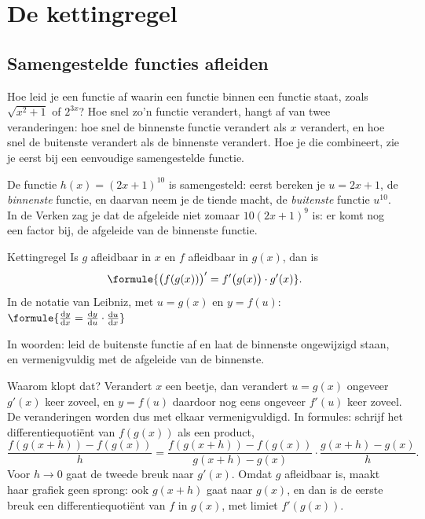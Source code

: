 \section{De kettingregel}

\subsection{Samengestelde functies afleiden}

Hoe leid je een functie af waarin een functie binnen een functie staat, zoals $\sqrt{x^2 + 1}$ of $2^{3x}$? Hoe snel zo'n functie verandert, hangt af van twee veranderingen: hoe snel de binnenste functie verandert als $x$ verandert, en hoe snel de buitenste verandert als de binnenste verandert. Hoe je die combineert, zie je eerst bij een eenvoudige samengestelde functie.

De functie $h(x) = (2x + 1)^{10}$ is samengesteld: eerst bereken je $u = 2x + 1$, de \textit{binnenste} functie, en daarvan neem je de tiende macht, de \textit{buitenste} functie $u^{10}$. In de Verken zag je dat de afgeleide niet zomaar $10(2x + 1)^9$ is: er komt nog een factor bij, de afgeleide van de binnenste functie.

\begin{theorie}
\begin{stelling}{Kettingregel}
Is $g$ afleidbaar in $x$ en $f$ afleidbaar in $g(x)$, dan is
\[\formule{\bigl(f(g(x))\bigr)' = f'\bigl(g(x)\bigr) \cdot g'(x)}.\]
In de notatie van Leibniz, met $u = g(x)$ en $y = f(u)$: \qquad $\formule{\frac{\mathrm{d}y}{\mathrm{d}x} = \frac{\mathrm{d}y}{\mathrm{d}u} \cdot \frac{\mathrm{d}u}{\mathrm{d}x}}$
\end{stelling}
\end{theorie}

In woorden: leid de buitenste functie af en laat de binnenste ongewijzigd staan, en vermenigvuldig met de afgeleide van de binnenste.

Waarom klopt dat? Verandert $x$ een beetje, dan verandert $u = g(x)$ ongeveer $g'(x)$ keer zoveel, en $y = f(u)$ daardoor nog eens ongeveer $f'(u)$ keer zoveel. De veranderingen worden dus met elkaar vermenigvuldigd. In formules: schrijf het differentiequotiënt van $f(g(x))$ als een product,
\[\frac{f(g(x + h)) - f(g(x))}{h} = \frac{f(g(x + h)) - f(g(x))}{g(x + h) - g(x)} \cdot \frac{g(x + h) - g(x)}{h} .\]
Voor $h \to 0$ gaat de tweede breuk naar $g'(x)$. Omdat $g$ afleidbaar is, maakt haar grafiek geen sprong: ook $g(x + h)$ gaat naar $g(x)$, en dan is de eerste breuk een differentiequotiënt van $f$ in $g(x)$, met limiet $f'(g(x))$.

